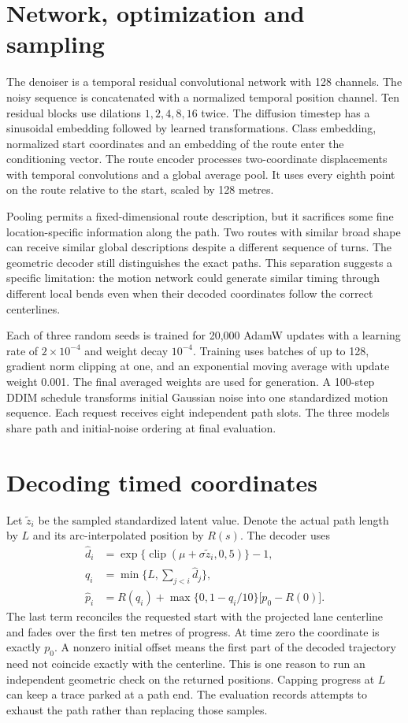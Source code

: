 \section{Network, optimization and sampling}
The denoiser is a temporal residual convolutional network with 128 channels. The noisy sequence is concatenated with a normalized temporal position channel. Ten residual blocks use dilations $1,2,4,8,16$ twice. The diffusion timestep has a sinusoidal embedding followed by learned transformations. Class embedding, normalized start coordinates and an embedding of the route enter the conditioning vector. The route encoder processes two-coordinate displacements with temporal convolutions and a global average pool. It uses every eighth point on the route relative to the start, scaled by 128 metres.

Pooling permits a fixed-dimensional route description, but it sacrifices some fine location-specific information along the path. Two routes with similar broad shape can receive similar global descriptions despite a different sequence of turns. The geometric decoder still distinguishes the exact paths. This separation suggests a specific limitation: the motion network could generate similar timing through different local bends even when their decoded coordinates follow the correct centerlines.

Each of three random seeds is trained for 20,000 AdamW updates with a learning rate of $2\times10^{-4}$ and weight decay $10^{-4}$. Training uses batches of up to 128, gradient norm clipping at one, and an exponential moving average with update weight 0.001. The final averaged weights are used for generation. A 100-step DDIM schedule transforms initial Gaussian noise into one standardized motion sequence. Each request receives eight independent path slots. The three models share path and initial-noise ordering at final evaluation.

\section{Decoding timed coordinates}
Let $\tilde z_i$ be the sampled standardized latent value. Denote the actual path length by $L$ and its arc-interpolated position by $R(s)$. The decoder uses
\begin{align}
 \hat d_i &=\exp\{\operatorname{clip}(\mu+\sigma\tilde z_i,0,5)\}-1,\\
 q_i &= \min\{L,\textstyle\sum_{j<i}\hat d_j\},\\
 \hat p_i &= R(q_i)+\max\{0,1-q_i/10\}\big[p_0-R(0)\big].
 \label{eq:decode}
\end{align}
The last term reconciles the requested start with the projected lane centerline and fades over the first ten metres of progress. At time zero the coordinate is exactly $p_0$. A nonzero initial offset means the first part of the decoded trajectory need not coincide exactly with the centerline. This is one reason to run an independent geometric check on the returned positions. Capping progress at $L$ can keep a trace parked at a path end. The evaluation records attempts to exhaust the path rather than replacing those samples.

